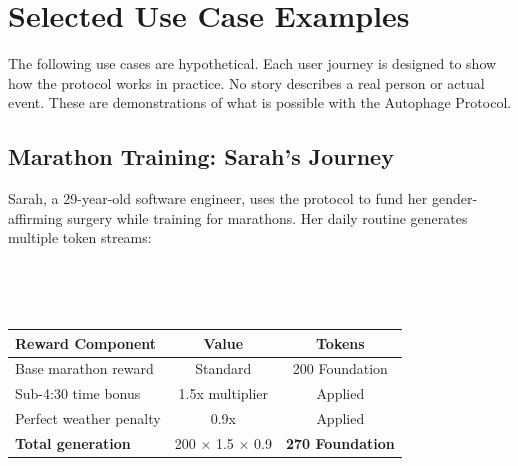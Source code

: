 \documentclass[11pt,letterpaper]{article}
\begin{document}
\clearpage
\section{Selected Use Case Examples}

The following use cases are hypothetical. Each user journey is designed to show how the protocol works in practice. No story describes a real person or actual event. These are demonstrations of what is possible with the Autophage Protocol.

\subsection{Marathon Training: Sarah's Journey}

Sarah, a 29-year-old software engineer, uses the protocol to fund her gender-affirming surgery while training for marathons. Her daily routine generates multiple token streams:

~


~


\begin{table}[H]
\centering
\begin{tabular}{lcc}
\toprule
\textbf{Reward Component} & \textbf{Value} & \textbf{Tokens} \\
\midrule
Base marathon reward & Standard & 200 Foundation \\
Sub-4:30 time bonus & 1.5x multiplier & Applied \\
Perfect weather penalty & 0.9x & Applied \\
\midrule
\textbf{Total generation} & 200 × 1.5 × 0.9 & \textbf{270 Foundation} \\
\bottomrule
\end{tabular}
\end{table}

\end{document}
